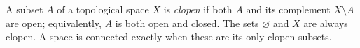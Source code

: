
A subset $A$ of a topological space $X$ is \emph{clopen} if both $A$ and its complement $X\setminus A$ are open; equivalently, $A$ is both open and closed. The sets $\varnothing$ and $X$ are always clopen. A space is connected exactly when these are its only clopen subsets.
